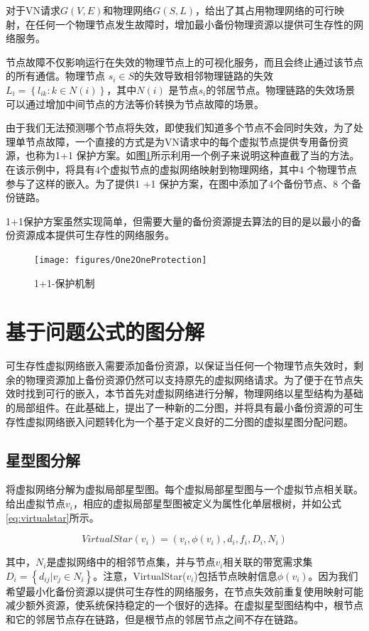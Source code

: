 对于VN请求$G (V,E)$和物理网络$G (S,L)$，给出了其占用物理网络的可行映射，在任何一个物理节点发生故障时，增加最小备份物理资源以提供可生存性的网络服务。

节点故障不仅影响运行在失效的物理节点上的可视化服务，而且会终止通过该节点的所有通信。物理节点 $ {s_i} \in S $的失效导致相邻物理链路的失效${L_i} = \left\{ {{l_{ik}}:k \in N(i)} \right\}$，其中${N(i)}$ 是节点$ {s_i} $的邻居节点。物理链路的失效场景可以通过增加中间节点的方法等价转换为节点故障的场景。

由于我们无法预测哪个节点将失效，即使我们知道多个节点不会同时失效，为了处理单节点故障，一个直接的方式是为VN请求中的每个虚拟节点提供专用备份资源，也称为1+1 保护方案。如图\ref{fig:One2OneProtection}所示利用一个例子来说明这种直截了当的方法。在该示例中，将具有4个虚拟节点的虚拟网络映射到物理网络，其中4 个物理节点参与了这样的嵌入。为了提供1 +1 保护方案，在图中添加了4个备份节点、8 个备份链路。

1+1保护方案虽然实现简单，但需要大量的备份资源提去算法的目的是以最小的备份资源成本提供可生存性的网络服务。

\begin{figure}[htb]
\centering
\texttt{[image: figures/One2OneProtection]}\\
\caption{1+1-保护机制}\label{fig:One2OneProtection}
\end{figure}
\section{基于问题公式的图分解}
可生存性虚拟网络嵌入需要添加备份资源，以保证当任何一个物理节点失效时，剩余的物理资源加上备份资源仍然可以支持原先的虚拟网络请求。为了便于在节点失效时找到可行的嵌入，本节首先对虚拟网络进行分解，物理网络以星型结构为基础的局部组件。在此基础上，提出了一种新的二分图，并将具有最小备份资源的可生存性虚拟网络嵌入问题转化为一个基于定义良好的二分图的虚拟星图分配问题。
\subsection{星型图分解}
将虚拟网络分解为虚拟局部星型图。每个虚拟局部星型图与一个虚拟节点相关联。给出虚拟节点$v_i$，相应的虚拟局部星型图被定义为属性化单层根树，并如公式\ref{eq:virtualstar}所示。

\begin{equation}
VirtualStar(v_i)=(v_i, \phi(v_i), d_i, f_i, D_i, N_i)
\label{eq:virtualstar}
\end{equation}


其中，$N_i$是虚拟网络中的相邻节点集，并与节点$v_i$相关联的带宽需求集${D_i} = \left\{ {{d_{ij}}|{v_j} \in {N_i}} \right\} $。注意，VirtualStar($v_i$)包括节点映射信息$\phi(v_i)$。因为我们希望最小化备份资源以提供可生存性的网络服务，在节点失效前重复使用映射可能减少额外资源，使系统保持稳定的一个很好的选择。在虚拟星型图结构中，根节点和它的邻居节点存在链路，但是根节点的邻居节点之间不存在链路。


